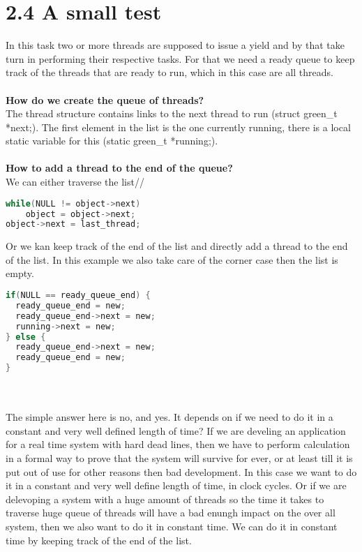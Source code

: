 \documentclass[10pt,a4paper]{article}
\begin{document}
\section*{2.4 A small test}
In this task two or more threads are supposed to issue a yield and by that take turn in performing their respective tasks. For that we need a ready queue to keep track of the threads that are ready to run, which in this case are all threads.\\
\\
\textbf{How do we create the queue of threads?}\\
The thread structure contains links to the next thread to run (struct green_t *next;). The first element in the list is the one currently running, there is a local static variable for this (static green_t *running;).\\
\\
\textbf{How to add a thread to the end of the queue?}\\
We can either traverse the list//
\begin{lstlisting}[language=C]
while(NULL != object->next)
	object = object->next;
object->next = last_thread;
\end{lstlisting}
Or we kan keep track of the end of the list and directly add a thread to the end of the list. In this example we also take care of the corner case then the list is empty.
\begin{lstlisting}[language=C]
if(NULL == ready_queue_end) {
  ready_queue_end = new;
  ready_queue_end->next = new;
  running->next = new;
} else {
  ready_queue_end->next = new;
  ready_queue_end = new;
}
\end{lstlisting}
\\
\\
The simple answer here is no, and yes. It depends on if we need to do it in a constant and very well defined length of time? If we are develing an application for a real time system with hard dead lines, then we have to perform calculation in a formal way to prove that the system will survive for ever, or at least till it is put out of use for other reasons then bad development. In this case we want to do it in a constant and very well define length of time, in clock cycles. Or if we are delevoping a system with a huge amount of threads so the time it takes to traverse huge queue of threads will have a bad enungh impact on the over all system, then we also want to do it in constant time. We can do it in constant time by keeping track of the end of the list.\\
\end{document}

